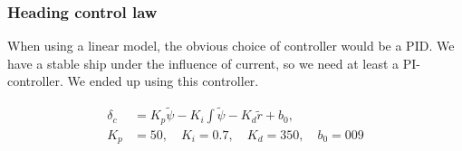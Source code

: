 \subsubsection*{Heading control law}
When using a linear model, the obvious choice of controller would be a PID. We have a stable ship under the influence of current, so we need at least a PI-controller. We ended up using this controller.

\begin{equation}
\begin{split}
    \delta_c &= K_p \tilde{\psi} - K_i \int \tilde{\psi} - K_d \tilde{r} + b_0,\\
    K_p &= 50,\quad K_i=0.7,\quad K_d=350,\quad b_0=009
\end{split}
\end{equation}